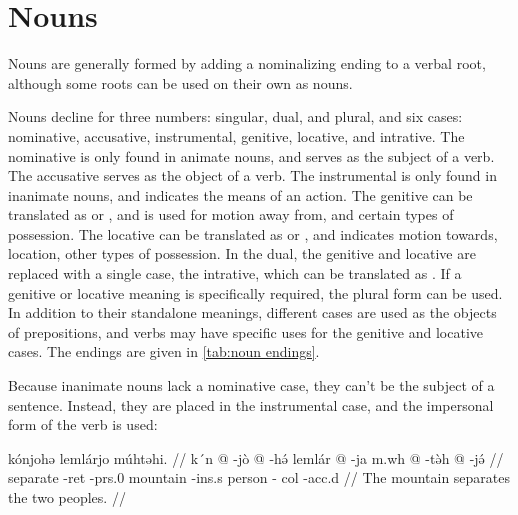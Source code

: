 \section{Nouns}

Nouns are generally formed by adding a nominalizing ending to a verbal root,
although some roots can be used on their own as nouns.

Nouns decline for three numbers: singular, dual, and plural, and six cases:
nominative, accusative, instrumental, genitive, locative, and intrative. The
nominative is only found in animate nouns, and serves as the subject of a verb.
The accusative serves as the object of a verb. The instrumental is only found
in inanimate nouns, and indicates the means of an action. The genitive can be
translated as  or , and is used for motion away from, and
certain types of possession. The locative can be translated as  or
, and indicates motion towards, location, other types of possession. In
the dual, the genitive and locative are replaced with a single case, the
intrative, which can be translated as . If a genitive or locative
meaning is specifically required, the plural form can be used. In addition to
their standalone meanings, different cases are used as the objects of
prepositions, and verbs may have specific uses for the genitive and locative
cases. The endings are given in \cref{tab:noun endings}.

Because inanimate nouns lack a nominative case, they can't be the subject of a
sentence. Instead, they are placed in the instrumental case, and the impersonal
form of the verb is used:

\ex
\begingl
    \glpreamble kónjohə lemlárjo múhtəhi. //
    \gla k´n @ -jò @ -hə́ lemlár @ -ja m.wh @ -tə̀h @ -jə́ //
    \glb separate -{\sc ret} -{\sc prs}.0 mountain -{\sc ins}.s person -{\sc
        col} -{\sc acc}.d //
    \glft The mountain separates the two peoples. //
\endgl
\xe

